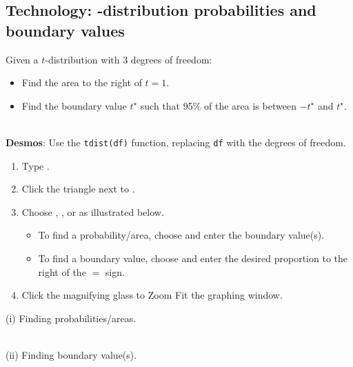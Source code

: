 \D{\newpage}

\subsection[Technology: $t$-distribution probabilities and boundary values]{Technology: -distribution probabilities and boundary values}
\label{techtdist}

\noindent Given a $t$-distribution with 3 degrees of freedom:
\begin{itemize}
\item[(i)] Find the area to the right of $t=1$.
\item[(ii)] Find the boundary value $t^{\star}$ such that 95\% of the area is between $-t^{\star}$ and $t^{\star}$.
\end{itemize}
 
\noindent \\
\textbf{Desmos}:  Use the \texttt{tdist(df)} function, replacing \texttt{df} with the degrees of freedom.
\begin{enumerate}
\setlength{\itemsep}{0mm}
\item Type .
\item Click the triangle next to .
\item Choose , ,  or  as illustrated below.
\begin{itemize}
\item[(i)] To find a probability/area, choose  and enter the boundary value(s).
\item[(ii)] To find a boundary value, choose  and enter the desired proportion to the right of the $=$ sign.  
\end{itemize}
\item Click the magnifying glass to Zoom Fit the graphing window.
\end{enumerate}

\noindent (i) Finding probabilities/areas.
\begin{center}
\end{center}
\noindent \\
(ii) Finding boundary value(s).
\begin{center}
\end{center}



